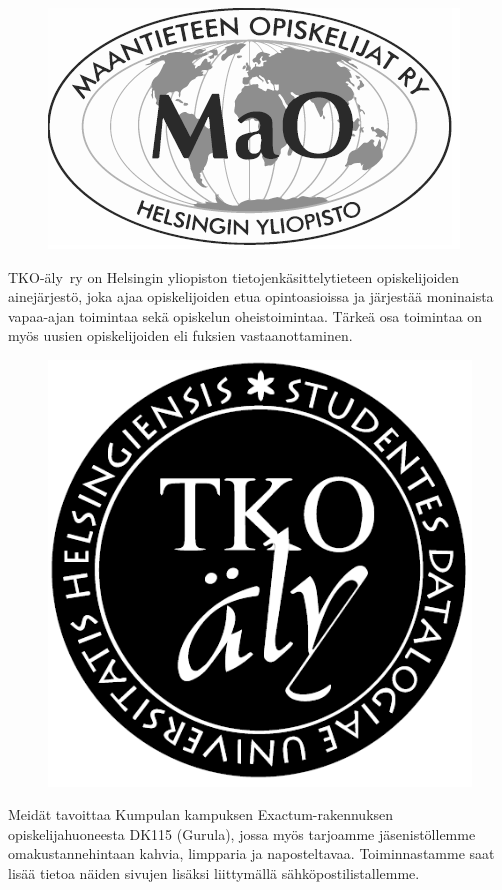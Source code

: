 \documentclass[a5paper, 8pt, twocolumn]{book} %
\numberwithin{equation}{section}
\begin{document}
\begin{figure}[!b]
	\centering
	\includegraphics[width=0.8\columnwidth]{maologo.png}
\end{figure}
TKO-äly~ry on Helsingin yliopiston tietojen\-käsittely\-tieteen
opiskelijoiden aine\-järjestö,
joka ajaa opiskelijoiden etua opinto\-asioissa
ja järjestää moninaista vapaa-ajan
toimintaa sekä opiskelun oheis\-toimintaa.
Tärkeä osa toimintaa on myös uusien opiskelijoiden
eli fuksien vastaan\-ottaminen.

\begin{figure}[!b]
	\centering
	\includegraphics[width=\columnwidth]{tkoaly.png}
\end{figure}
Meidät tavoittaa Kumpulan kampuksen
Exactum-rakennuksen opiskelija\-huoneesta
DK115 (Gurula), jossa myös tarjoamme
jäsenistöllemme oma\-kustanne\-hintaan kahvia,
limpparia ja naposteltavaa.
Toiminnastamme saat lisää tietoa näiden
sivujen lisäksi liittymällä sähkö\-posti\-listallemme.
\end{document}
